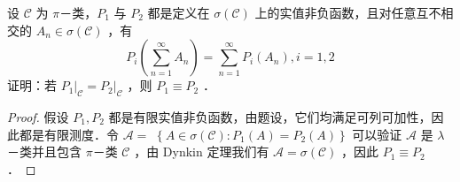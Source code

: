 \begin{exercise}
    设 $\mathscr{C}$ 为 $\pi$－类，$P_1$ 与 $P_2$ 都是定义在 $\sigma(\mathscr{C})$ 上的实值非负函数，且对任意互不相交的 $A_n \in \sigma(\mathscr{C})$ ，有
    $$
        P_i\left(\sum_{n=1}^{\infty} A_n\right)=\sum_{n=1}^{\infty} P_i\left(A_n\right), i=1,2
    $$
    证明：若 $\left.P_1\right|_{\mathscr{C}}=\left.P_2\right|_{\mathscr{C}}$ ，则 $P_1 \equiv P_2$ ．
\end{exercise}
\begin{proof}
    假设 $P_1, P_2$ 都是有限实值非负函数，由题设，它们均满足可列可加性，因此都是有限测度．令 $\mathscr{A}=$ $\left\{A \in \sigma(\mathscr{C}): P_1(A)=P_2(A)\right\}$ 可以验证 $\mathscr{A}$ 是 $\lambda$－类并且包含 $\pi$－类 $\mathscr{C}$ ，由 Dynkin 定理我们有 $\mathscr{A}=\sigma(\mathscr{C})$ ，因此 $P_1 \equiv P_2$ ．
\end{proof}

